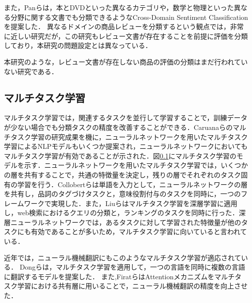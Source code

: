 \documentclass[dvipdfmx,twocolumn,10.5pt]{jsarticle}
\begin{document}
また，Panらは，本とDVDといった異なるカテゴリや，数学と物理といった異なる分野に関する文書でも分類できるようなCross-Domain Sentiment Classificationを提案した．\cite{pan2010cross}
異なるドメインの商品レビューを分類するという観点では，非常に近しい研究だが，この研究もレビュー文書が存在することを前提に評価を分類しており，本研究の問題設定とは異なっている．

本研究のような，レビュー文書が存在しない商品の評価の分類はまだ行われていない研究である．


\subsection{マルチタスク学習}\label{multitask_learning}
マルチタスク学習では，関連するタスクを並行して学習することで，訓練データが少ない場合でも分類タスクの精度を改善することができる．Caruanaらのマルチタスク学習の研究成果\cite{caruana1997multitask}を機に，ニューラルネットワークを用いたマルチタスク学習によるNLPモデルもいくつか提案され，ニューラルネットワークにおいてもマルチタスク学習が有効であることが示された．図\ref{multitask_learning}にマルチタスク学習のモデルを示す．ニューラルネットワークを用いたマルチタスク学習では，いくつかの層を共有することで，共通の特徴量を決定し，残りの層でそれぞれのタスク固有の学習を行う．Collobertらは単語を入力として，ニューラルネットワークの層を共有し，品詞のタグづけタスクと，意味役割付与のタスクを同時に，一つのフレームワークで実現した．\cite{collobert2008unified}また，Liuらはマルチタスク学習を深層学習に適用し，web検索におけるクエリの分類と，ランキングのタスクを同時に行った．\cite{liu2015representation}深層ニューラルネットワークでは，あるタスクに対して学習された特徴量が他のタスクにも有効であることが多いため，マルチタスク学習に向いていると言われている．

近年では，ニューラル機械翻訳にもこのようなマルチタスク学習が適応されている．
Dongらは，マルチタスク学習を適用して，一つの言語を同時に複数の言語に翻訳するモデルを提案した．\cite{dong2015multi}
また,FiratらはAttentionメカニズムをマルチタスク学習における共有層に用いることで，ニューラル機械翻訳の精度を向上させた．\cite{firat2016multi}

\end{document}
